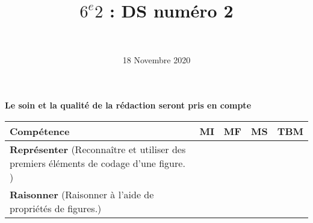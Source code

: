 \documentclass[a4paper,11pt]{exam}
\author{\ }
\date{18 Novembre 2020}
\title{$6^e 2$ : DS num\'ero 2}
\begin{document}
%	

	\maketitle
	
\begin{center}
	\textbf{Le soin et la qualité de la rédaction seront pris en compte}
\end{center}

\begin{small}
	\begin{center}
		\begin{tabular}{|@{\ }l@{\ }|@{\ }c@{\ }|@{\ }c@{\ }|@{\ }c@{\ }|@{\ }c@{\ }|}
			\hline
			\textbf{Compétence} & \textbf{MI} & \textbf{MF} & \textbf{MS} & \textbf{TBM} \\
			\hline
			\textbf{Représenter} (Reconnaître et utiliser des premiers éléments de codage d'une figure. ) &  \ \ & \ \ & \ \ & \ \  \\
			\hline	
			\textbf{Raisonner} (Raisonner à l'aide de propriétés de figures.) & \ \ & \ \ &  \ \  & \ \ \\
			\hline
		\end{tabular}
	\end{center}
\end{small}	

	
	
	






\newpage




\label{LastPage}

%
\end{document}
